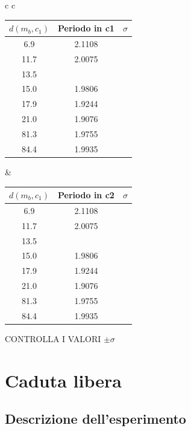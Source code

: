 \documentclass[a4paper,10pt]{report}
\begin{document}
\begin{center}
\begin{tabular}{c   c}
\begin{tabular}{|c|c|c|}
$d(m_b,c_1)$ & Periodo in c1 & $\sigma$ \\
\midrule
6.9 & 2.1108 &\\
11.7 & 2.0075 &\\
13.5 & &\\
15.0 &  1.9806 &\\
17.9 & 1.9244 &\\
21.0 & 1.9076 &\\
81.3 & 1.9755&\\
84.4 & 1.9935&\\
\end{tabular}
&
\begin{tabular}{|c|c|c|}
$d(m_b,c_1)$ & Periodo in c2 & $\sigma$ \\
\midrule
6.9 & 2.1108 &\\
11.7 & 2.0075 &\\
13.5 & &\\
15.0 &  1.9806 &\\
17.9 & 1.9244 &\\
21.0 & 1.9076 &\\
81.3 & 1.9755&\\
84.4 & 1.9935&\\
\end{tabular}
\end{tabular}
\end{center}
CONTROLLA I VALORI
$\pm\sigma$

\section{Caduta libera}

\subsection{Descrizione dell'esperimento}
\end{document}
